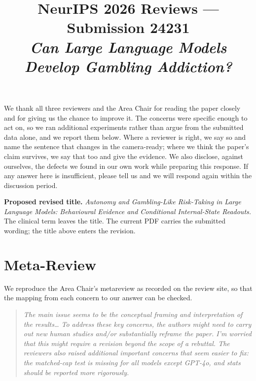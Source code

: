 \documentclass[11pt]{article}
\title{\vspace{-2.5em}\textbf{NeurIPS 2026 Reviews --- Submission 24231}\\[0.5em]
\large\normalfont\itshape Can Large Language Models Develop Gambling Addiction?}
\date{}
\author{}
\begin{document}
\maketitle
\thispagestyle{empty}

\noindent
We thank all three reviewers and the Area Chair for reading the paper closely and for giving us
the chance to improve it. The concerns were specific enough to act on, so we ran additional
experiments rather than argue from the submitted data alone, and we report them below. Where a
reviewer is right, we say so and name the sentence that changes in the camera-ready; where we
think the paper's claim survives, we say that too and give the evidence. We also disclose,
against ourselves, the defects we found in our own work while preparing this response. If any
answer here is insufficient, please tell us and we will respond again within the discussion
period.

\vspace{0.6em}

\begin{center}
\begin{minipage}{0.88\linewidth}
\small
\textbf{Proposed revised title.} \emph{Autonomy and Gambling-Like Risk-Taking in Large Language
Models: Behavioural Evidence and Conditional Internal-State Readouts.}
The clinical term leaves the title. The current PDF carries the submitted wording; the title
above enters the revision.
\end{minipage}
\end{center}

\vspace{0.5em}

\section*{Meta-Review}

We reproduce the Area Chair's metareview as recorded on the review site, so that the mapping from
each concern to our answer can be checked.

\begin{quote}
\itshape
The main issue seems to be the conceptual framing and interpretation of the results\ldots{}
To address these key concerns, the authors might need to carry out new human studies and/or
substantially reframe the paper. I'm worried that this might require a revision beyond the
scope of a rebuttal.
The reviewers also raised additional important concerns that seem easier to fix: the matched-cap
test is missing for all models except GPT-4o, and stats should be reported more rigorously.
\end{quote}
\end{document}
